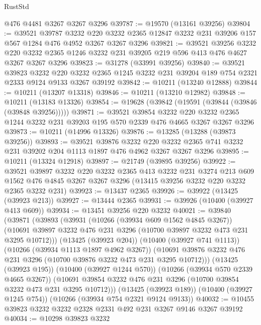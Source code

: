\begin{lexlean}{RustStd}
\begin{coremodule}
    @476
    @4481
    @3267
    @3267
    @3296
@39787 := @19570 (@13161 @39256)
@39804 := @39521
    @39787
    @3232
    @220
    @3232
    @2365
    @12847
    @3232
    @231
    @39206
    @157
    @567
    @1284
    @476
    @4952
    @3267
    @3267
    @3296
@39821 := @39521
    @39256
    @3232
    @220
    @3232
    @2365
    @1246
    @3232
    @231
    @39205
    @219
    @596
    @413
    @476
    @4627
    @3267
    @3267
    @3296
@39823 := @31278 (@33991 @39256)
@39840 := @39521
    @39823
    @3232
    @220
    @3232
    @2365
    @1245
    @3232
    @231
    @39204
    @189
    @754
    @2321
    @2333
    @9124
    @9133
    @3267
    @39192
@39842 := @10211 (@13240 @12888)
@39844 := @10211 (@13207 @13318)
@39846 := @10211 (@13210 @12982)
@39848 := @10211 (@13183 @13326)
@39854 := @19628 (@39842 (@19591 (@39844 (@39846 (@39848 @39256)))))
@39871 := @39521
    @39854
    @3232
    @220
    @3232
    @2365
    @1244
    @3232
    @231
    @39203
    @195
    @570
    @2339
    @476
    @4665
    @3267
    @3267
    @3296
@39873 := @10211 (@14996 @13326)
@39876 := @13285 (@13288 (@39873 @39256))
@39893 := @39521
    @39876
    @3232
    @220
    @3232
    @2365
    @741
    @3232
    @231
    @39202
    @204
    @1113
    @1897
    @476
    @4962
    @3267
    @3267
    @3296
@39895 := @10211 (@13324 @12918)
@39897 := @21749 (@39895 @39256)
@39922 := @39521
    @39897
    @3232
    @220
    @3232
    @2365
    @413
    @3232
    @231
    @3274
    @213
    @609
    @1562
    @476
    @4845
    @3267
    @3267
    @3296
    (@13415 @39256 @3232 @220 @3232 @2365 @3232 @231)
@39923 := @13437 @2365
@39926 := @39922 (@13425 (@39923 @213))
@39927 := @13444 @2365
@39931 := @39926 (@10400 (@39927 @413 @609))
@39934 := @13451 @39256 @220 @3232
@40021 := @39840
    (@39871
      (@39893
        (@39931
          (@10266 (@39934 @609 @1562 @4845 @3267))
          (@10691 @39897 @3232 @476 @231 @3296 (@10700 @39897 @3232 @473 @231 @3295 @10712)))
        (@13425 (@39923 @204))
        (@10400 (@39927 @741 @1113))
        (@10266 (@39934 @1113 @1897 @4962 @3267))
        (@10691 @39876 @3232 @476 @231 @3296 (@10700 @39876 @3232 @473 @231 @3295 @10712)))
      (@13425 (@39923 @195))
      (@10400 (@39927 @1244 @570))
      (@10266 (@39934 @570 @2339 @4665 @3267))
      (@10691 @39854 @3232 @476 @231 @3296 (@10700 @39854 @3232 @473 @231 @3295 @10712)))
    (@13425 (@39923 @189))
    (@10400 (@39927 @1245 @754))
    (@10266 (@39934 @754 @2321 @9124 @9133))
@40032 := @10455 @39823 @3232 @3232 @2328 @2331 @492 @231 @3267 @9146 @3267 @39192
@40034 := @10298 @39823 @3232

\end{coremodule}
\end{lexlean}

